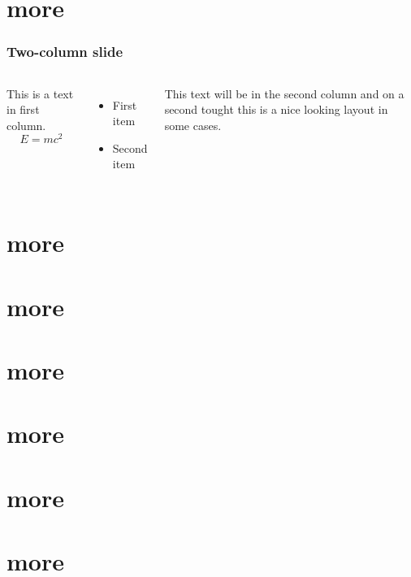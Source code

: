 \documentclass{beamer}
\begin{document}
\section{more}

\begin{frame}
\frametitle{Two-column slide}

\begin{columns}

This is a text in first column.
$$E=mc^2$$
\begin{itemize}
\item First item
\item Second item
\end{itemize}

This text will be in the second column
and on a second tought this is a nice looking
layout in some cases.
\end{columns}
\end{frame}

\section{more}
\section{more}
\section{more}
\section{more}
\section{more}
\section{more}
\end{document}
